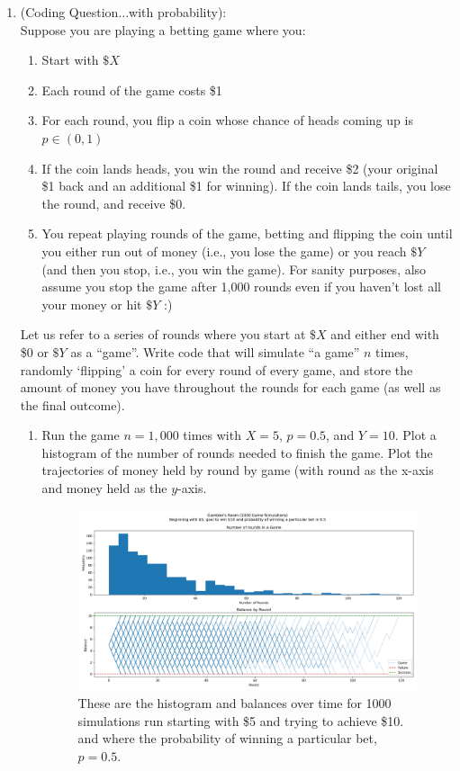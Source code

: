 \documentclass[10pt]{amsart}
\theoremstyle{nonumberplain}
\begin{document}
\begin{enumerate}[label={\bf {Question \arabic*}}]
\item (Coding Question...with probability): \\
Suppose you are playing a betting game where you:
\begin{enumerate}
\item Start with $\$X$
\item Each round of the game costs \$1
\item For each round, you flip a coin whose chance of heads coming up is $p \in (0, 1)$
\item If the coin lands heads, you win the round and receive \$2 (your original \$1 back and an additional \$1 for winning).
If the coin lands tails, you lose the round, and receive \$0.
\item You repeat playing rounds of the game, betting and flipping the coin until you either run out of money (i.e., you lose the game) or you reach $\$Y$ (and then you stop, i.e., you win the game).
For sanity purposes, also assume you stop the game after 1,000 rounds even if you haven’t lost all your money or hit $\$Y$ :) \\
\end{enumerate}
Let us refer to a series of rounds where you start at $\$X$ and either end with \$0 or $\$Y$ as a “game”.
Write code that will simulate “a game” $n$ times, randomly ‘flipping’ a coin for every round of every game, and store the amount of money you have throughout the rounds for each game (as well as the final outcome).

\begin{enumerate}
\item Run the game $n = 1,000$ times with $X = 5$, $p = 0.5$, and $Y = 10$. Plot a histogram of the number of rounds needed to finish the game.
Plot the trajectories of money held by round by game (with round as the x-axis and money held as the $y$-axis.

\begin{figure}[h]
	\centering
	\includegraphics[width=1\textwidth]{balance_by_round_and_histogram.png}
 	\caption{These are the histogram and balances over time for 1000 simulations run starting with \$5 and trying to achieve \$10.
	and where the probability of winning a particular bet, $p = 0.5$.}\label{fig:f1}
\end{figure}


\end{enumerate}
\end{enumerate}
\end{document}
